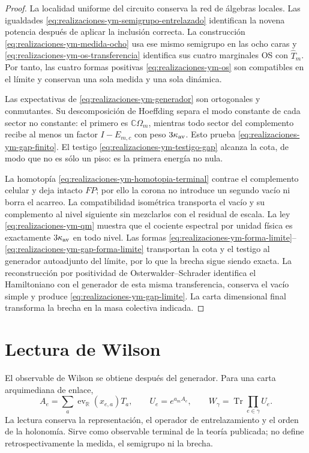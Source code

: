 \begin{proof}
La localidad uniforme del circuito conserva la red de álgebras locales. Las
igualdades \eqref{eq:realizaciones-ym-semigrupo-entrelazado} identifican la
novena potencia después de aplicar la inclusión correcta. La construcción
\eqref{eq:realizaciones-ym-medida-ocho} usa ese mismo semigrupo en las ocho
caras y \eqref{eq:realizaciones-ym-os-transferencia} identifica sus cuatro
marginales OS con \(\widehat T_m\). Por tanto, las cuatro formas positivas
\eqref{eq:realizaciones-ym-os} son compatibles en el límite y conservan una
sola medida y una sola dinámica.

Las expectativas de \eqref{eq:realizaciones-ym-generador} son ortogonales y
conmutantes. Su descomposición de Hoeffding separa el modo constante de cada
sector no constante: el primero es \(\mathbb C\Omega_m\), mientras todo
sector del complemento recibe al menos un factor \(I-E_{m,c}\) con peso
\(3\kappa_{\rm av}\). Esto prueba
\eqref{eq:realizaciones-ym-gap-finito}. El testigo
\eqref{eq:realizaciones-ym-testigo-gap} alcanza la cota, de modo que no es
sólo un piso: es la primera energía no nula.

La homotopía \eqref{eq:realizaciones-ym-homotopia-terminal} contrae el
complemento celular y deja intacto \(FP\); por ello la corona no introduce un
segundo vacío ni borra el acarreo. La compatibilidad isométrica transporta el
vacío y su complemento al nivel siguiente sin mezclarlos con el residual de
escala. La ley
\eqref{eq:realizaciones-ym-qm} muestra que el cociente espectral por unidad
física es exactamente \(3\kappa_{\rm av}\) en todo nivel. Las formas
\eqref{eq:realizaciones-ym-forma-limite}--
\eqref{eq:realizaciones-ym-gap-forma-limite} transportan la cota y el testigo
al generador autoadjunto del límite, por lo que la brecha sigue siendo exacta.
La reconstrucción por positividad de
Osterwalder--Schrader identifica el Hamiltoniano con el generador de esta
misma transferencia, conserva el vacío simple y produce
\eqref{eq:realizaciones-ym-gap-limite}. La carta dimensional final transforma
la brecha en la masa colectiva indicada.
\end{proof}



\section*{Lectura de Wilson}

El observable de Wilson se obtiene después del generador. Para una carta
arquimediana de enlace,
\begin{equation}\label{eq:realizaciones-ym-wilson}
 A_e=\sum_a\operatorname{ev}_{\mathbb R}(x_{e,a})T_a,
 \qquad
 U_e=e^{a_mA_e},
 \qquad
 W_\gamma=\operatorname{Tr}\!\prod_{e\in\gamma}U_e.
\end{equation}
La lectura conserva la representación, el operador de entrelazamiento y el
orden de la holonomía. Sirve como observable terminal de la teoría publicada; no define
retrospectivamente la medida, el semigrupo ni la brecha.


